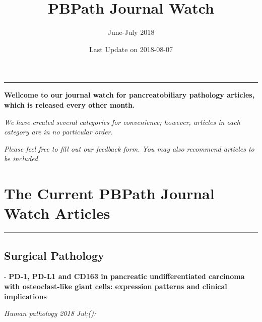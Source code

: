\documentclass[]{article}
\title{PBPath Journal Watch}
\subtitle{June-July 2018}
\author{}
\date{Last Update on 2018-08-07}
\begin{document}
\maketitle

{
\setcounter{tocdepth}{2}
\tableofcontents
}
\begin{center}\rule{0.5\linewidth}{\linethickness}\end{center}

\textbf{Wellcome to our journal watch for pancreatobiliary pathology
articles, which is released every other month.}

\emph{We have created several categories for convenience; however,
articles in each category are in no particular order.}

\emph{Please feel free to fill out our feedback form. You may also
recommend articles to be included.}

\pagebreak

\hypertarget{the-current-pbpath-journal-watch-articles}{%
\section{The Current PBPath Journal Watch
Articles}\label{the-current-pbpath-journal-watch-articles}}

\begin{center}\rule{0.5\linewidth}{\linethickness}\end{center}

\hypertarget{surgical-pathology}{%
\subsection{Surgical Pathology}\label{surgical-pathology}}

 - \textbf{PD-1, PD-L1 and CD163 in pancreatic undifferentiated
carcinoma with osteoclast-like giant cells: expression patterns and
clinical implications}

\emph{Human pathology 2018 Jul;():}
\end{document}
